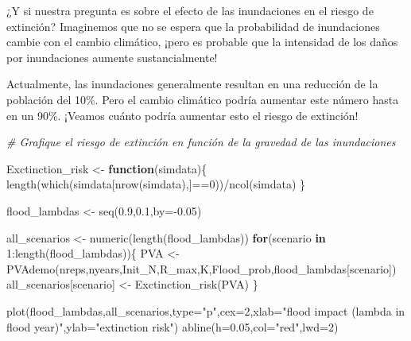 \documentclass[
]{article}
\newenvironment{Shaded}{\begin{snugshade}}{\end{snugshade}}
\newcommand{\AttributeTok}[1]{\textcolor[rgb]{0.77,0.63,0.00}{#1}}
\newcommand{\CommentTok}[1]{\textcolor[rgb]{0.56,0.35,0.01}{\textit{#1}}}
\newcommand{\ControlFlowTok}[1]{\textcolor[rgb]{0.13,0.29,0.53}{\textbf{#1}}}
\newcommand{\DecValTok}[1]{\textcolor[rgb]{0.00,0.00,0.81}{#1}}
\newcommand{\FloatTok}[1]{\textcolor[rgb]{0.00,0.00,0.81}{#1}}
\newcommand{\FunctionTok}[1]{\textcolor[rgb]{0.00,0.00,0.00}{#1}}
\newcommand{\NormalTok}[1]{#1}
\newcommand{\OtherTok}[1]{\textcolor[rgb]{0.56,0.35,0.01}{#1}}
\newcommand{\SpecialCharTok}[1]{\textcolor[rgb]{0.00,0.00,0.00}{#1}}
\newcommand{\StringTok}[1]{\textcolor[rgb]{0.31,0.60,0.02}{#1}}
\begin{document}
¿Y si nuestra pregunta es sobre el efecto de las inundaciones en el
riesgo de extinción? Imaginemos que no se espera que la probabilidad de
inundaciones cambie con el cambio climático, ¡pero es probable que la
intensidad de los daños por inundaciones aumente sustancialmente!

Actualmente, las inundaciones generalmente resultan en una reducción de
la población del 10\%. Pero el cambio climático podría aumentar este
número hasta en un 90\%. ¡Veamos cuánto podría aumentar esto el riesgo
de extinción!

\begin{Shaded}
\begin{Highlighting}[]
\CommentTok{\# Grafique el riesgo de extinción en función de la gravedad de las inundaciones}

\NormalTok{Exctinction\_risk }\OtherTok{\textless{}{-}} \ControlFlowTok{function}\NormalTok{(simdata)\{}
  \FunctionTok{length}\NormalTok{(}\FunctionTok{which}\NormalTok{(simdata[}\FunctionTok{nrow}\NormalTok{(simdata),]}\SpecialCharTok{==}\DecValTok{0}\NormalTok{))}\SpecialCharTok{/}\FunctionTok{ncol}\NormalTok{(simdata)}
\NormalTok{\}}

\NormalTok{flood\_lambdas }\OtherTok{\textless{}{-}} \FunctionTok{seq}\NormalTok{(}\FloatTok{0.9}\NormalTok{,}\FloatTok{0.1}\NormalTok{,}\AttributeTok{by=}\SpecialCharTok{{-}}\FloatTok{0.05}\NormalTok{)}

\NormalTok{all\_scenarios }\OtherTok{\textless{}{-}} \FunctionTok{numeric}\NormalTok{(}\FunctionTok{length}\NormalTok{(flood\_lambdas))}
\ControlFlowTok{for}\NormalTok{(scenario }\ControlFlowTok{in} \DecValTok{1}\SpecialCharTok{:}\FunctionTok{length}\NormalTok{(flood\_lambdas))\{}
\NormalTok{  PVA }\OtherTok{\textless{}{-}} \FunctionTok{PVAdemo}\NormalTok{(nreps,nyears,Init\_N,R\_max,K,Flood\_prob,flood\_lambdas[scenario])}
\NormalTok{  all\_scenarios[scenario] }\OtherTok{\textless{}{-}} \FunctionTok{Exctinction\_risk}\NormalTok{(PVA)}
\NormalTok{\}}

\FunctionTok{plot}\NormalTok{(flood\_lambdas,all\_scenarios,}\AttributeTok{type=}\StringTok{"p"}\NormalTok{,}\AttributeTok{cex=}\DecValTok{2}\NormalTok{,}\AttributeTok{xlab=}\StringTok{"flood impact (lambda in flood year)"}\NormalTok{,}\AttributeTok{ylab=}\StringTok{"extinction risk"}\NormalTok{)}
\FunctionTok{abline}\NormalTok{(}\AttributeTok{h=}\FloatTok{0.05}\NormalTok{,}\AttributeTok{col=}\StringTok{"red"}\NormalTok{,}\AttributeTok{lwd=}\DecValTok{2}\NormalTok{)}
\end{Highlighting}
\end{Shaded}
\end{document}
